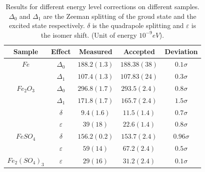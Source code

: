 \documentclass[aps,twocolumn,secnumarabic,balancelastpage,amsmath,amssymb,nofootinbib]{revtex4}
\begin{document}
\begin{table}
  \begin{tabular}{|c|c|c|c|c|}
    \hline
    Sample&Effect&Measured&Accepted&Deviation\\\hline
    $Fe$\cite{data3}&$\Delta_0$&$188.2(1.3)$&$188.38(38)$&$0.1\sigma$\\\cline{2-5}
    &$\Delta_1$&$107.4(1.3)$&$107.83(24)$&$0.3\sigma$\\\hline
    $Fe_2O_3$\cite{data1}\cite{data2}&$\Delta_0$&$296.8(1.7)$&$293.5(2.4)$&$0.8\sigma$\\\cline{2-5}
    &$\Delta_1$&$171.8(1.7)$&$165.7(2.4)$&$1.5\sigma$\\\cline{2-5}
    &$\delta$&$9.4(1.6)$&$11.5(1.4)$&$0.7\sigma$\\\cline{2-5}
    &$\varepsilon$&$39(18)$&$22.6(1.4)$&$0.8\sigma$\\\hline
    $FeSO_4$\cite{data1}&$\delta$&$156.2(0.2)$&$153.7(2.4)$&$0.96\sigma$\\\cline{2-5}
    &$\varepsilon$&$59(14)$&$67.2(2.4)$&$0.5\sigma$\\\hline
    $Fe_2(SO_4)_3$\cite{data1}&$\varepsilon$&$29(16)$&$31.2(2.4)$&$0.1\sigma$\\\hline
  \end{tabular}
  \caption{Results for different energy level corrections on different samples. $\Delta_0$ and $\Delta_1$ are the Zeeman splitting of the groud state and the excited state respectively. $\delta$ is the quadrapole splitting and $\varepsilon$ is the isomer shift. (Unit of energy $10^{-9}eV$).}
  \label{res_table}
\end{table}
\end{document}

